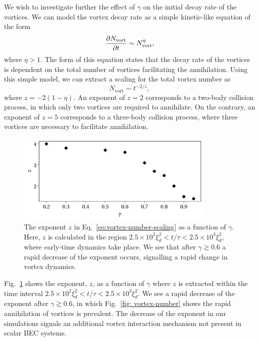 We wish to investigate further the effect of \(\gamma \) on the initial decay
rate of the vortices.
We can model the vortex decay rate as a simple kinetic-like equation of the form
\begin{equation}
    \pdv{N_\mathrm{vort}}{t} \sim N_\mathrm{vort}^\eta,
\end{equation}
where \(\eta > 1\).
The form of this equation states that the decay rate of the vortices is
dependent on the total number of vortices facilitating the annihilation.
Using this simple model, we can extract a scaling for the total vortex
number as
\begin{equation}
    N_\mathrm{vort} \sim t^{-2/z},
    \label{eq:vortex-number-scaling}
\end{equation}
where \(z=-2(1-\eta)\).
An exponent of \(z=2\) corresponds to a two-body collision process, in which
only two vortices are required to annihilate.
On the contrary, an exponent of \(z=5\) corresponds to a three-body collision
process, where three vortices are necessary to facilitate annihilation.
\begin{figure}[t!]
    \centering
    \includegraphics[width=0.85\textwidth]{
        gfx/ch-twoCompDynamics/gamma_vs_expo.pdf}
    \caption[Critical exponent as a function of \(\gamma \)]
    {\label{fig: exponent-vs-gamma}The exponent \( z \) in
        Eq.~\eqref{eq:vortex-number-scaling} as a function of \(\gamma \).
        Here, \(z\) is calculated in the region \(2.5 \times 10^2\xi_d^2 <
        t/\tau < 2.5\times10^3\xi_d^2\), where early-time dynamics take place.
        We see that after \(\gamma \gtrsim 0.6\) a rapid decrease of the
        exponent occurs, signalling a rapid change in vortex dynamics.}
\end{figure}
Fig.~\ref{fig: exponent-vs-gamma} shows the exponent, \( z \), as a function of
\(\gamma \) where \( z \) is extracted within the time interval
\(2.5 \times 10^2\xi_d^2 < t/\tau < 2.5\times10^3\xi_d^2\).
We see a rapid decrease of the exponent after \(\gamma \gtrsim 0.6\), in which
Fig.~\ref{fig: vortex-number} shows the rapid annihilation of vortices is
prevalent.
The decrease of the exponent in our simulations signals an additional vortex
interaction mechanism not present in scalar BEC systems.

